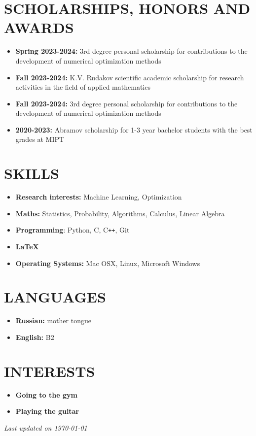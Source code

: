 \documentclass[12pt]{moderncv}
\begin{document}
    \section{SCHOLARSHIPS, HONORS AND AWARDS}

        \begin{itemize}
            \item \textbf{Spring 2023-2024:} 3rd degree personal scholarship for contributions to the development of numerical optimization methods
            \item \textbf{Fall 2023-2024:} K.V. Rudakov scientific academic scholarship for research activities in the field of applied mathematics
            \item \textbf{Fall 2023-2024:} 3rd degree personal scholarship for contributions to the development of numerical optimization methods
            \item \textbf{2020-2023:} Abramov scholarship for 1-3 year bachelor students with the best grades at MIPT
        \end{itemize}

    \section{SKILLS}
    
        \begin{itemize}
            \item \textbf{Research interests:} Machine Learning, Optimization
            \item \textbf{Maths:} Statistics, Probability, Algorithms, Calculus, Linear Algebra
            \item \textbf{Programming}: Python, C, C\texttt{++}, Git
            \item \textbf{\LaTeX}
            \item \textbf{Operating Systems:} Mac OSX, Linux, Microsoft Windows
        \end{itemize}

    \section{LANGUAGES}

        \begin{itemize}
            \item \textbf{Russian:} mother tongue
            \item \textbf{English:} B2
        \end{itemize}

    \section{INTERESTS}

        \begin{itemize}
            \item \textbf{Going to the gym}
            \item \textbf{Playing the guitar}
        \end{itemize}

    \emptysection{}\closesection{}
    \begin{center}
    \textit{Last updated on \today}
    \end{center}
\end{document}

